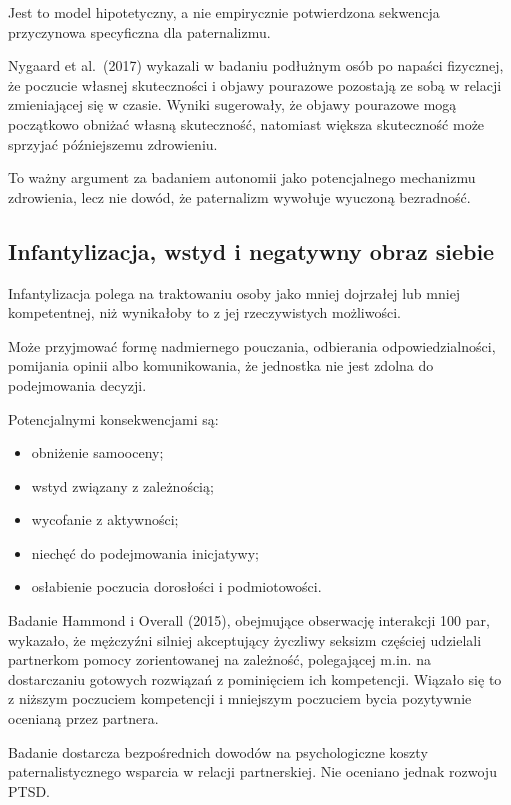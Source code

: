 \documentclass[11pt,a4paper,oneside,headinclude=true,footinclude=false]{scrartcl}
\providecommand{\tightlist}{\setlength{\itemsep}{3pt}\setlength{\parskip}{0pt}}
\begin{document}
Jest to model hipotetyczny, a nie empirycznie potwierdzona sekwencja
przyczynowa specyficzna dla paternalizmu.

Nygaard et al.~(2017) wykazali w badaniu podłużnym osób po napaści
fizycznej, że poczucie własnej skuteczności i objawy pourazowe pozostają
ze sobą w relacji zmieniającej się w czasie. Wyniki sugerowały, że
objawy pourazowe mogą początkowo obniżać własną skuteczność, natomiast
większa skuteczność może sprzyjać późniejszemu zdrowieniu.

To ważny argument za badaniem autonomii jako potencjalnego mechanizmu
zdrowienia, lecz nie dowód, że paternalizm wywołuje wyuczoną bezradność.

\subsection{Infantylizacja, wstyd i negatywny obraz siebie}\label{subsec:3.4}

Infantylizacja polega na traktowaniu osoby jako mniej dojrzałej lub
mniej kompetentnej, niż wynikałoby to z jej rzeczywistych możliwości.

Może przyjmować formę nadmiernego pouczania, odbierania
odpowiedzialności, pomijania opinii albo komunikowania, że jednostka nie
jest zdolna do podejmowania decyzji.

Potencjalnymi konsekwencjami są:

\begin{itemize}
\tightlist
\item
  obniżenie samooceny;
\item
  wstyd związany z zależnością;
\item
  wycofanie z aktywności;
\item
  niechęć do podejmowania inicjatywy;
\item
  osłabienie poczucia dorosłości i podmiotowości.
\end{itemize}

Badanie Hammond i Overall (2015), obejmujące obserwację interakcji 100
par, wykazało, że mężczyźni silniej akceptujący życzliwy seksizm
częściej udzielali partnerkom pomocy zorientowanej na zależność,
polegającej m.in. na dostarczaniu gotowych rozwiązań z pominięciem ich
kompetencji. Wiązało się to z niższym poczuciem kompetencji i mniejszym
poczuciem bycia pozytywnie ocenianą przez partnera.

Badanie dostarcza bezpośrednich dowodów na psychologiczne koszty
paternalistycznego wsparcia w relacji partnerskiej. Nie oceniano jednak
rozwoju PTSD.
\end{document}
